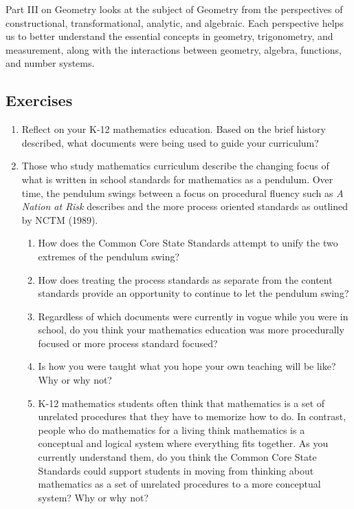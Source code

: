 \documentclass[
]{book}
\providecommand{\tightlist}{%
  \setlength{\itemsep}{0pt}\setlength{\parskip}{0pt}}
\theoremstyle{definition}
\theoremstyle{definition}
\theoremstyle{definition}
\theoremstyle{remark}
\begin{document}
Part III on Geometry looks at the subject of Geometry from the perspectives of constructional, transformational, analytic, and algebraic. Each perspective helps us to better understand the essential concepts in geometry, trigonometry, and measurement, along with the interactions between geometry, algebra, functions, and number systems.

\hypertarget{exercises-2}{%
\subsection{Exercises}\label{exercises-2}}

\begin{enumerate}
\def\labelenumi{\arabic{enumi}.}
\item
  Reflect on your K-12 mathematics education. Based on the brief history described, what documents were being used to guide your curriculum?
\item
  Those who study mathematics curriculum describe the changing focus of what is written in school standards for mathematics as a pendulum. Over time, the pendulum swings between a focus on procedural fluency such as \emph{A Nation at Risk} \citeyearpar{NCEE1983} describes and the more process oriented standards as outlined by NCTM (1989).

  \begin{enumerate}
  \def\labelenumii{\alph{enumii})}
  \tightlist
  \item
    How does the Common Core State Standards attempt to unify the two extremes of the pendulum swing?
  \item
    How does treating the process standards as separate from the content standards provide an opportunity to continue to let the pendulum swing?
  \item
    Regardless of which documents were currently in vogue while you were in school, do you think your mathematics education was more procedurally focused or more process standard focused?
  \item
    Is how you were taught what you hope your own teaching will be like? Why or why not?
  \item
    K-12 mathematics students often think that mathematics is a set of unrelated procedures that they have to memorize how to do. In contrast, people who do mathematics for a living think mathematics is a conceptual and logical system where everything fits together. As you currently understand them, do you think the Common Core State Standards could support students in moving from thinking about mathematics as a set of unrelated procedures to a more conceptual system? Why or why not?
  \end{enumerate}
\end{enumerate}
\end{document}
